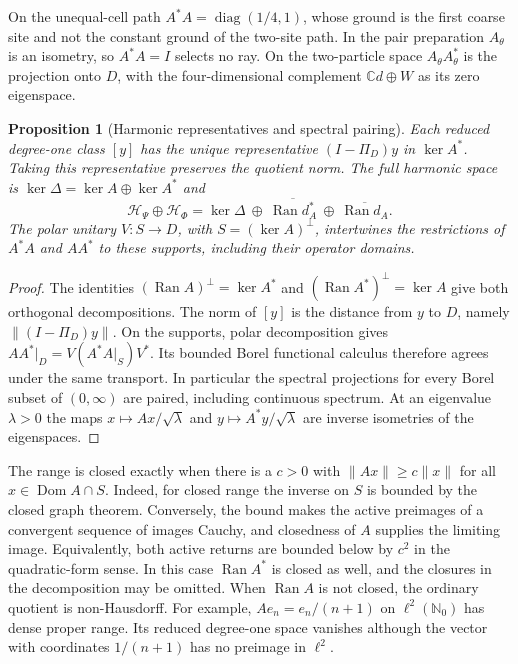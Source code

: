 \documentclass[11pt]{article}
\newtheorem{proposition}{Proposition}[section]
\theoremstyle{definition}
\DeclareMathOperator{\Ran}{Ran}
\newcommand{\C}{\mathbb C}
\begin{document}
On the unequal-cell path $A^*A=\operatorname{diag}(1/4,1)$, whose ground is the first coarse site and not the constant ground of the two-site path. In the pair preparation $A_\theta$ is an isometry, so $A^*A=I$ selects no ray. On the two-particle space $A_\theta A_\theta^*$ is the projection onto $D$, with the four-dimensional complement $\C d\oplus W$ as its zero eigenspace.

\begin{proposition}[Harmonic representatives and spectral pairing]\label{prop:index-harmonic-pairing}
Each reduced degree-one class $[y]$ has the unique representative $(I-\Pi_D)y$ in $\ker A^*$. Taking this representative preserves the quotient norm. The full harmonic space is $\ker\Delta=\ker A\oplus\ker A^*$ and
\[
 \mathcal H_\Psi\oplus\mathcal H_\Phi
     =\ker\Delta\ \oplus\ \overline{\Ran d_A^*}\ \oplus\ \overline{\Ran d_A}.
\]
The polar unitary $V:S\to D$, with $S=(\ker A)^\perp$, intertwines the restrictions of $A^*A$ and $AA^*$ to these supports, including their operator domains.
\end{proposition}
\begin{proof}
The identities $(\Ran A)^\perp=\ker A^*$ and $(\Ran A^*)^\perp=\ker A$ give both orthogonal decompositions. The norm of $[y]$ is the distance from $y$ to $D$, namely $\|(I-\Pi_D)y\|$. On the supports, polar decomposition gives $AA^*|_D=V(A^*A|_S)V^*$. Its bounded Borel functional calculus therefore agrees under the same transport. In particular the spectral projections for every Borel subset of $(0,\infty)$ are paired, including continuous spectrum. At an eigenvalue $\lambda>0$ the maps $x\mapsto Ax/\sqrt\lambda$ and $y\mapsto A^*y/\sqrt\lambda$ are inverse isometries of the eigenspaces.
\end{proof}

The range is closed exactly when there is a $c>0$ with $\|Ax\|\ge c\|x\|$ for all $x\in\operatorname{Dom}A\cap S$. Indeed, for closed range the inverse on $S$ is bounded by the closed graph theorem. Conversely, the bound makes the active preimages of a convergent sequence of images Cauchy, and closedness of $A$ supplies the limiting image. Equivalently, both active returns are bounded below by $c^2$ in the quadratic-form sense. In this case $\Ran A^*$ is closed as well, and the closures in the decomposition may be omitted. When $\Ran A$ is not closed, the ordinary quotient is non-Hausdorff. For example, $Ae_n=e_n/(n+1)$ on $\ell^2(\mathbb N_0)$ has dense proper range. Its reduced degree-one space vanishes although the vector with coordinates $1/(n+1)$ has no preimage in $\ell^2$.
\end{document}
